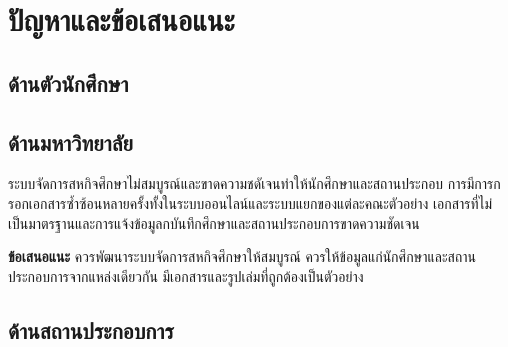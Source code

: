 \chapter{ปัญหาและข้อเสนอแนะ}
\label{chapter:result}

\section{ด้านตัวนักศึกษา}

\section{ด้านมหาวิทยาลัย}

ระบบจัดการสหกิจศึกษาไม่สมบูรณ์และขาดความชดัเจนท่าให้นักศึกษาและสถานประกอบ การมีการกรอกเอกสารซ้ำซ้อนหลายครั้งทั้งในระบบออนไลน์และระบบแยกของแต่ละคณะตัวอย่าง เอกสารที่ไม่เป็นมาตรฐานและการแจ้งข้อมูลกบันทึกศึกษาและสถานประกอบการขาดความชัดเจน

\textbf{ข้อเสนอแนะ} ควรพัฒนาระบบจัดการสหกิจศึกษาให้สมบูรณ์ ควรให้ข้อมูลแก่นักศึกษาและสถานประกอบการจากแหล่งเดียวกัน มีเอกสารและรูปเล่มที่ถูกต้องเป็นตัวอย่าง

\section{ด้านสถานประกอบการ}